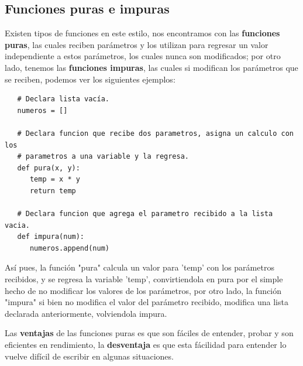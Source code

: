 \subsection{Funciones puras e impuras}
\hspace{0.55cm}Existen tipos de funciones en este estilo, nos encontramos con las \textbf{funciones puras}, las cuales reciben parámetros y los utilizan para regresar un valor independiente a estos parámetros, los cuales nunca son modificados; por otro lado, tenemos las \textbf{funciones impuras}, las cuales si modifican los parámetros que se reciben, podemos ver los siguientes ejemplos:
\begin{lstlisting}
   # Declara lista vacía.
   numeros = []

   # Declara funcion que recibe dos parametros, asigna un calculo con los
   # parametros a una variable y la regresa.
   def pura(x, y):
      temp = x * y
      return temp
   
   # Declara funcion que agrega el parametro recibido a la lista vacia.
   def impura(num):
      numeros.append(num)
\end{lstlisting}

Así pues, la función "pura" calcula un valor para 'temp' con los parámetros recibidos, y se regresa la variable 'temp', convirtiendola en pura por el simple hecho de no modificar los valores de los parámetros, por otro lado, la función "impura" si bien no modifica el valor del parámetro recibido, modifica una lista declarada anteriormente, volviendola impura.

Las \textbf{ventajas} de las funciones puras es que son fáciles de entender, probar y son eficientes en rendimiento, la \textbf{desventaja} es que esta fácilidad para entender lo vuelve difícil de escribir en algunas situaciones.